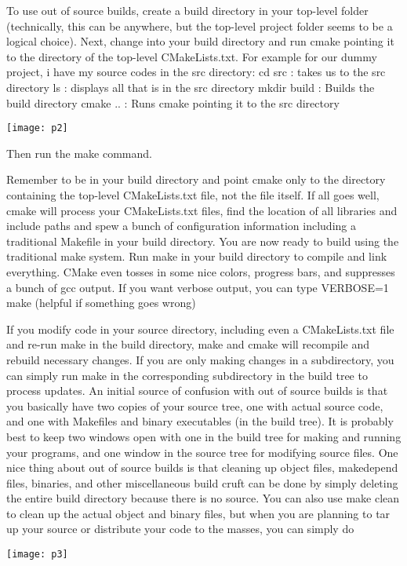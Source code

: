 \documentclass[11pt,utf8]{article}
\begin{document}
To use out of source builds, create a build directory in your top-level folder (technically, this can be anywhere, but the top-level project folder seems to be a logical choice). Next, change into your build directory and run cmake pointing it to the directory of the top-level CMakeLists.txt. For example for our dummy project, i have my source codes in the src directory:
cd src : takes us to the src directory
ls : displays all that is in the src directory
mkdir build : Builds the build directory
cmake .. : Runs cmake pointing it to the src directory
\begin{center}
\texttt{[image: p2]}
 \end{center}
 
 

Then run the make command.

Remember to be in your build directory and point cmake only to the directory containing the top-level CMakeLists.txt file, not the file itself. If all goes well, cmake will process your CMakeLists.txt files, find the location of all libraries and include paths and spew a bunch of configuration information including a traditional Makefile in your build directory. You are now ready to build using the traditional make system. Run make in your build directory to compile and link everything. CMake even tosses in some nice colors, progress bars, and suppresses a bunch of gcc output. If you want verbose output, you can type VERBOSE=1 make (helpful if something goes wrong)

If you modify code in your source directory, including even a CMakeLists.txt file and re-run make in the build directory, make and cmake will recompile and rebuild necessary changes. If you are only making changes in a subdirectory, you can simply run make in the corresponding subdirectory in the build tree to process updates. An initial source of confusion with out of source builds is that you basically have two copies of your source tree, one with actual source code, and one with Makefiles and binary executables (in the build tree). It is probably best to keep two windows open with one in the build tree for making and running your programs, and one window in the source tree for modifying source files. One nice thing about out of source builds is that cleaning up object files, makedepend files, binaries, and other miscellaneous build cruft can be done by simply deleting the entire build directory because there is no source. You can also use make clean to clean up the actual object and binary files, but when you are planning to tar up your source or distribute your code to the masses, you can simply do
\begin{center}
\texttt{[image: p3]}
 \end{center}
 
\end{document}
